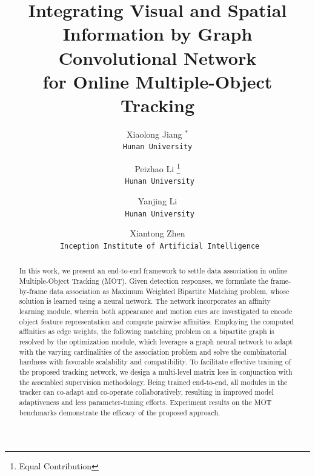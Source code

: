 \documentclass[10pt,twocolumn,letterpaper]{article}
\begin{document}
\title{Integrating Visual and Spatial Information by Graph Convolutional Network \\
for Online Multiple-Object Tracking}

\author{Xiaolong Jiang $^{*}$\\
{\tt Hunan University}
\and
Peizhao Li \thanks{Equal Contribution}\\
{\tt\ Hunan University}
\and
Yanjing Li\\
{\tt\ Hunan University}
\and
Xiantong Zhen\\
{\tt\ Inception Institute of Artificial Intelligence}
}

\maketitle
\thispagestyle{empty}

\begin{abstract}
In this work, we present an end-to-end framework to settle data association in online Multiple-Object Tracking (MOT). Given detection responses, we formulate the frame-by-frame data association as Maximum Weighted Bipartite Matching problem, whose solution is learned using a neural network. The network incorporates an affinity learning module, wherein both appearance and motion cues are investigated to encode object feature representation and compute pairwise affinities. Employing the computed affinities as edge weights, the following matching problem on a bipartite graph is resolved by the optimization module, which leverages a graph neural network to adapt with the varying cardinalities of the association problem and solve the combinatorial hardness with favorable scalability and compatibility. To facilitate effective training of the proposed tracking network, we design a multi-level matrix loss in conjunction with the assembled supervision methodology. Being trained end-to-end, all modules in the tracker can co-adapt and co-operate collaboratively, resulting in improved model adaptiveness and less parameter-tuning efforts. Experiment results on the MOT benchmarks demonstrate the efficacy of the proposed approach.
\end{abstract}
\end{document}

